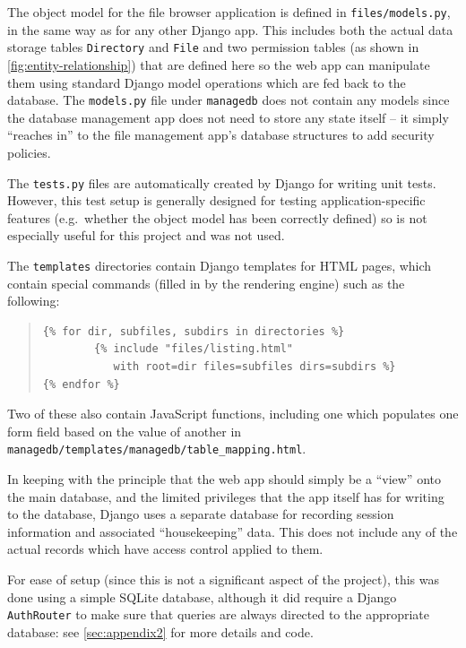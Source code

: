 \documentclass[12pt]{report}
\begin{document}
The object model for the file browser application is defined in \texttt{files/models.py}, in the same way as for any other Django app. This includes both the actual data storage tables \texttt{Directory} and \texttt{File} and two permission tables (as shown in \autoref{fig:entity-relationship}) that are defined here so the web app can manipulate them using standard Django model operations which are fed back to the database. The \texttt{models.py} file under \texttt{managedb} does not contain any models since the database management app does not need to store any state itself -- it simply ``reaches in'' to the file management app's database structures to add security policies.

The \texttt{tests.py} files are automatically created by Django for writing unit tests. However, this test setup is generally designed for testing application-specific features (e.g.\ whether the object model has been correctly defined) so is not especially useful for this project and was not used.

The \texttt{templates} directories contain Django templates for HTML pages, which contain special commands (filled in by the rendering engine) such as the following:

\begin{quote}
\begin{samepage}
\begin{verbatim}
{% for dir, subfiles, subdirs in directories %}
        {% include "files/listing.html"
           with root=dir files=subfiles dirs=subdirs %}
{% endfor %}
\end{verbatim}
\end{samepage}
\end{quote}

Two of these also contain JavaScript functions, including one which populates one form field based on the value of another in \verb+managedb/templates/managedb/table_mapping.html+.

In keeping with the principle that the web app should simply be a ``view'' onto the main database, and the limited privileges that the app itself has for writing to the database, Django uses a separate database for recording session information and associated ``housekeeping'' data. This does not include any of the actual records which have access control applied to them.

For ease of setup (since this is not a significant aspect of the project), this was done using a simple SQLite database, although it did require a Django \texttt{AuthRouter} to make sure that queries are always directed to the appropriate database: see \autoref{sec:appendix2} for more details and code.
\end{document}
